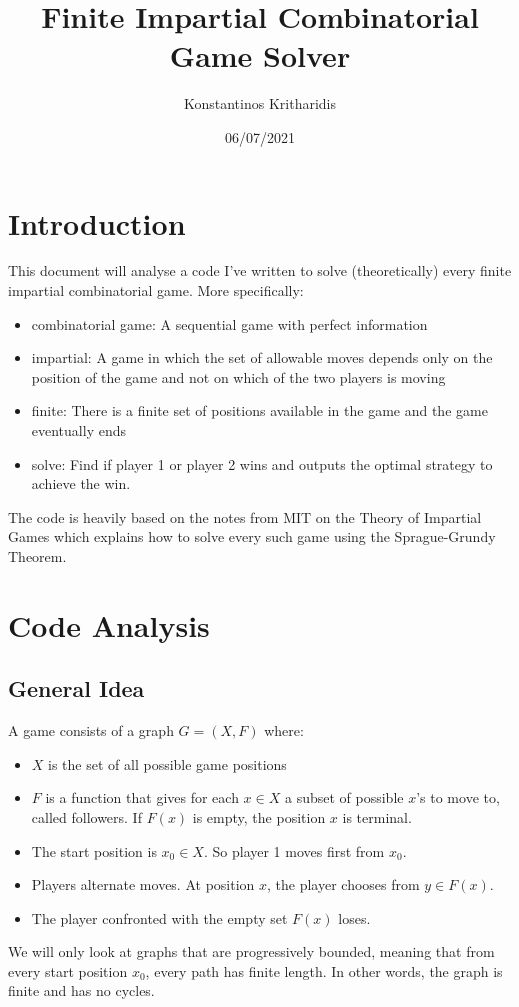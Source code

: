 \documentclass{article}
\title{Finite Impartial Combinatorial Game Solver}
\author{Konstantinos Kritharidis}
\date{06/07/2021}
\begin{document}
\maketitle

\section{Introduction}

This document will analyse a code I've written to solve (theoretically) every finite impartial combinatorial game. More specifically:
\begin{itemize}
  \item combinatorial game\cite{combinatorial_wiki}: A sequential game with perfect information
  \item impartial\cite{mit}: A game in which the set of allowable moves depends only on the position of the game and not on which of the two players is moving
  \item finite\cite{mit}: There is a finite set of positions available in the game and the game eventually ends
  \item solve: Find if player 1 or player 2 wins and outputs the optimal strategy to achieve the win.
\end{itemize}
The code is heavily based on the notes\cite{mit} from MIT on the Theory of Impartial Games which explains how to solve every such game using the Sprague-Grundy Theorem\cite{sg}.

\section{Code Analysis}

\subsection{General Idea}

A game consists of a graph $G = (X, F)$ where\cite{mit}:
\begin{itemize}
\item $X$ is the set of all possible game positions
\item $F$ is a function that gives for each $x \in X$ a subset of possible $x$’s to move to, called followers. If $F(x)$ is empty, the position $x$ is terminal.
\item The start position is $x_0 \in X$. So player 1 moves first from $x_0$.
\item Players alternate moves. At position $x$, the player chooses from $y \in F(x)$.
\item The player confronted with the empty set $F(x)$ loses.
\end{itemize}
We will only look at graphs that are progressively bounded\cite{mit}, meaning that from every start position $x_0$, every path has finite length. In other words, the graph is finite and has no cycles.
\end{document}
